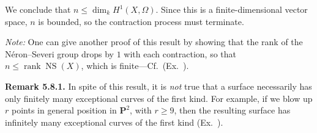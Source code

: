 {We conclude that $n\le\dim_kH^1(X,\Omega)$. Since this is a finite-dimensional vector space, $n$ is bounded, so the contraction process must terminate.

\emph{Note:} One can give another proof of this result by showing that the rank of the N\'eron--Severi group drops by $1$ with each contraction, so that $n\le\operatorname{rank}\operatorname{NS}(X)$, which is finite---Cf.\ (Ex.~).

\medskip
\noindent\hypertarget{result-V-5.8.1}{}\textbf{Remark 5.8.1.} In spite of this result, it is \emph{not} true that a surface necessarily has only finitely many exceptional curves of the first kind. For example, if we blow up $r$ points in general position in $\mathbf P^2$, with $r\ge9$, then the resulting surface has infinitely many exceptional curves of the first kind (Ex.~).}
